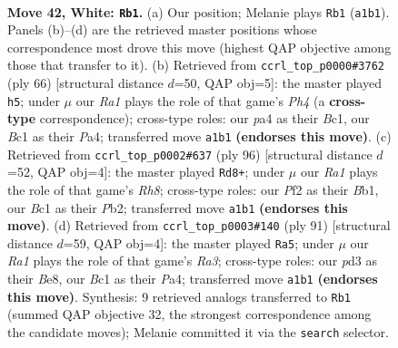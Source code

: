 \documentclass[11pt]{article}
\begin{document}
\clearpage

\begin{figure}[p]\centering
\begin{subfigure}{0.46\textwidth}\centering
\resizebox{\linewidth}{!}{%
\newchessgame
\chessboard[
  setfen={7k/5prr/5n2/8/p3p2p/3p3P/PP3P1R/R1B1K3 w - - 24 42},
  showmover=false,
  pgfstyle=straightmove, color=movearrow, markmove={a1-b1}
]}
\caption{}
\end{subfigure}\hfill
\begin{subfigure}{0.46\textwidth}\centering
\resizebox{\linewidth}{!}{%
\newchessgame
\chessboard[
  setfen={3r4/3r2p1/2pk4/p3p3/P1n1P1RP/2P5/2K1R3/2B5 w - - 3 34},
  showmover=false,
  pgfstyle=straightmove, color=movearrow, markmove={h4-h5}
]}
\caption{}
\end{subfigure}
\\[4pt]
\begin{subfigure}{0.46\textwidth}\centering
\resizebox{\linewidth}{!}{%
\newchessgame
\chessboard[
  setfen={7R/p3r2p/1p1k2p1/3r1nP1/P5RP/8/KP6/1B6 w - - 25 49},
  showmover=false,
  pgfstyle=straightmove, color=movearrow, markmove={h8-d8}
]}
\caption{}
\end{subfigure}\hfill
\begin{subfigure}{0.46\textwidth}\centering
\resizebox{\linewidth}{!}{%
\newchessgame
\chessboard[
  setfen={2r1bk2/5p2/r3p1p1/4P1P1/p1P4P/N1K5/1R6/1R6 b - - 16 46},
  showmover=false,
  pgfstyle=straightmove, color=movearrow, markmove={a6-a5}
]}
\caption{}
\end{subfigure}
\caption{\textbf{Move 42, White: \texttt{Rb1}.} (a) Our position; Melanie plays \texttt{Rb1} (\texttt{a1b1}). Panels (b)--(d) are the retrieved master positions whose correspondence most drove this move (highest QAP objective among those that transfer to it). (b) Retrieved from \texttt{ccrl\_top\_p0000\#3762} (ply 66) [structural distance $d$=50, QAP obj=5]: the master played \texttt{h5}; under $\mu$ our \emph{Ra1} plays the role of that game's \emph{Ph4} (a \textbf{cross-type} correspondence); cross-type roles: our \emph{p}a4 as their \emph{B}c1, our \emph{B}c1 as their \emph{P}a4; transferred move \texttt{a1b1} \textbf{(endorses this move)}. (c) Retrieved from \texttt{ccrl\_top\_p0002\#637} (ply 96) [structural distance $d$=52, QAP obj=4]: the master played \texttt{Rd8+}; under $\mu$ our \emph{Ra1} plays the role of that game's \emph{Rh8}; cross-type roles: our \emph{P}f2 as their \emph{B}b1, our \emph{B}c1 as their \emph{P}b2; transferred move \texttt{a1b1} \textbf{(endorses this move)}. (d) Retrieved from \texttt{ccrl\_top\_p0003\#140} (ply 91) [structural distance $d$=59, QAP obj=4]: the master played \texttt{Ra5}; under $\mu$ our \emph{Ra1} plays the role of that game's \emph{Ra3}; cross-type roles: our \emph{p}d3 as their \emph{B}e8, our \emph{B}c1 as their \emph{P}a4; transferred move \texttt{a1b1} \textbf{(endorses this move)}. Synthesis: 9 retrieved analogs transferred to \texttt{Rb1} (summed QAP objective 32, the strongest correspondence among the candidate moves); Melanie committed it via the \texttt{search} selector.}
\label{fig:thought-m82}
\end{figure}
\end{document}
